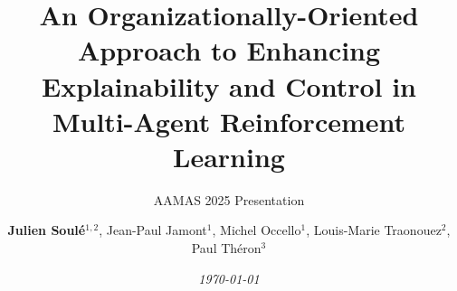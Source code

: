 \author{
    \textbf{Julien Soulé}$^{1,2}$, Jean-Paul Jamont$^{1}$, Michel Occello$^{1}$, Louis-Marie Traonouez$^{2}$, Paul Théron$^{3}$
}

\title{\textbf{An Organizationally-Oriented Approach to Enhancing Explainability and Control in Multi-Agent Reinforcement Learning}}

\subtitle{AAMAS 2025 Presentation}




\date{\textit{\footnotesize \today}}

